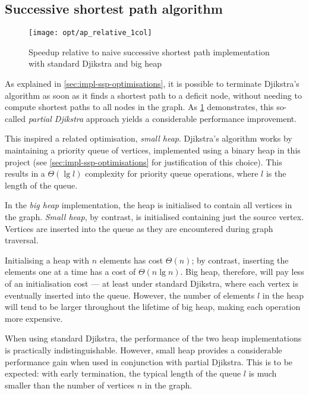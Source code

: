 \subsection{Successive shortest path algorithm}

\begin{figure}
    \centering
    \texttt{[image: opt/ap\_relative\_1col]}
    \caption{Speedup relative to naive successive shortest path implementation with standard Djikstra and big heap}
    \label{fig:opt-ap}
\end{figure}

As explained in \cref{sec:impl-ssp-optimisations}, it is possible to terminate Djikstra's algorithm as soon as it finds a shortest path to a deficit node, without needing to compute shortest paths to all nodes in the graph. As \cref{fig:opt-ap} demonstrates, this so-called \emph{partial Djikstra} approach yields a considerable performance improvement.

This inspired a related optimisation, \emph{small heap}. Djikstra's algorithm works by maintaining a priority queue of vertices, implemented using a binary heap in this project (see \cref{sec:impl-ssp-optimisations} for justification of this choice). This results in a $\Theta\left(\lg l\right)$ complexity for priority queue operations, where $l$ is the length of the queue.

In the \emph{big heap} implementation, the heap is initialised to contain all vertices in the graph. \emph{Small heap}, by contrast, is initialised containing just the source vertex. Vertices are inserted into the queue as they are encountered during graph traversal.

Initialising a heap with $n$ elements has cost $\Theta(n)$; by contrast, inserting the elements one at a time has a cost of $\Theta(n\lg n)$. Big heap, therefore, will pay less of an initialisation cost --- at least under standard Djikstra, where each vertex is eventually inserted into the queue. However, the number of elements $l$ in the heap will tend to be larger throughout the lifetime of big heap, making each operation more expensive.

When using standard Djikstra, the performance of the two heap implementations is practically indistinguishable. However, small heap provides a considerable performance gain when used in conjunction with partial Djikstra. This is to be expected: with early termination, the typical length of the queue $l$ is much smaller than the number of vertices $n$ in the graph.


